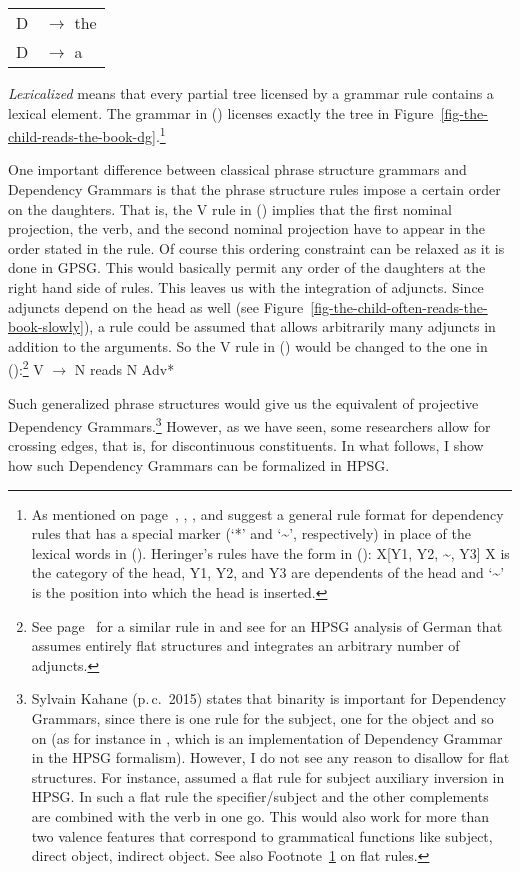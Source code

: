 \begin{tabular}[t]{@{}l@{ }l}
{D}  & {$\to$ the}\\
{D}  & {$\to$ a}\\
\end{tabular}
\z
\emph{Lexicalized}  means that every partial tree licensed by a grammar rule contains a lexical element.
The grammar in () licenses exactly the tree in
Figure~\ref{fig-the-child-reads-the-book-dg}.\footnote{\label{fn-flat-dg-rules}%
As mentioned on page~\pageref{page-rule-format-dg}, \citet[]{Gaifman65a}, \citet[]{Hays64a-u}, \citet[]{Baumgaertner70a} and \citet[]{Heringer96a-u} suggest a
general rule format for dependency rules that has a special marker (`*' and `\textasciitilde', respectively) in place of the lexical words in (). Heringer's rules have the
form in ():
\ea
X[Y1, Y2, \textasciitilde, Y3]
\z
X is the category of the head, Y1, Y2, and Y3 are dependents of the head and `\textasciitilde' is the position into
which the head is inserted.
}

One important difference between classical phrase structure grammars and Dependency Grammars is that the
phrase structure rules impose a certain order on the daughters. That is, the V rule in ()
implies that the first nominal projection, the verb, and the second nominal projection have to
appear in the order stated in the rule. Of course this ordering constraint can be relaxed as it is
done in GPSG. This would basically permit any order of the daughters at the right hand side of
rules.
This leaves us with the integration of adjuncts. Since adjuncts depend on the head as well (see
Figure~\vref{fig-the-child-often-reads-the-book-slowly}), a rule could be assumed that allows
arbitrarily many adjuncts in addition to the arguments. So the V rule in () would be changed
to the one in ():\footnote{
  See page~\pageref{adv-metarule} for a similar rule in \gpsg and see \citet{Kasper94a} for an HPSG
analysis of German that assumes entirely flat structures and integrates an arbitrary number of adjuncts.
}
\ea
V $\to$ N reads N Adv*
\z 


Such generalized phrase structures would give us the equivalent of projective Dependency
Grammars.\footnote{\label{fn-dg-binary-branching}%
Sylvain Kahane (p.\,c.\, 2015) states that binarity is important for Dependency Grammars, since
there is one rule for the subject, one for the object and so on (as for instance in
\citealp{Kahane2009a}, which is an implementation of Dependency Grammar in the HPSG formalism). However, I do not see any reason
to disallow for flat structures. For instance, \citet[]{GSag2000a-u} assumed a flat rule for subject
auxiliary inversion in HPSG. In such a flat rule the specifier/subject and the other complements are
combined with the verb in one go. This would also work for more than two valence features that correspond
to grammatical functions like subject, direct object, indirect object. See also
Footnote~\ref{fn-flat-dg-rules} on flat rules.
} However, as we have seen, some researchers allow for crossing edges, that is, for
discontinuous constituents. In what follows, I show how such Dependency Grammars can be formalized in
HPSG.

